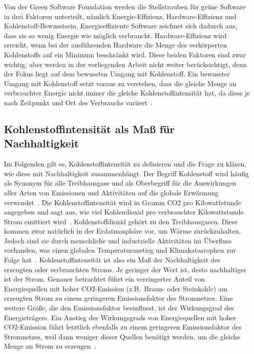 Von der Green Software Foundation werden die Stellstrauben für grüne Software in drei Faktoren unterteilt, nämlich Energie-Effizienz, Hardware-Effizienz und Kohlenstoff-Bewusstsein.
Energieeffiziente Software zeichnet sich dadurch aus, dass sie so wenig Energie wie möglich verbraucht.
Hardware-Effizienz wird erreicht, wenn bei der ausführenden Hardware die Menge des verkörperten Kohlenstoffs auf ein Minimum beschränkt wird.
Diese beiden Faktoren sind zwar wichtig, aber werden in der vorliegenden Arbeit nicht weiter berücksichtigt, denn der Fokus liegt auf dem bewussten Umgang mit Kohlenstoff.
Ein bewusster Umgang mit Kohlenstoff setzt voraus zu verstehen, dass die gleiche Menge an verbrauchter Energie nicht immer die gleiche Kohlenstoffintensität hat, da diese je nach Zeitpunkt und Ort des Verbrauchs variiert~\cite{GreenSoftwareFoundation.2022}.

\subsection{Kohlenstoffintensität als Maß für Nachhaltigkeit}
Im Folgenden gilt es, Kohlenstoffintensität zu definieren und die Frage zu klären, wie diese mit Nachhaltigkeit zusammenhängt.
Der Begriff Kohlenstoff wird häufig als Synonym für alle Treibhausgase und als Oberbegriff für die Auswirkungen aller Arten von Emissionen und Aktivitäten auf die globale Erwärmung verwendet~\cite{GreenSoftwareFoundation.2022}.
Die Kohlenstoffintensität wird in Gramm CO2 pro Kilowattstunde angegeben und sagt aus, wie viel Kohlendioxid pro verbrauchter Kilowattstunde Strom emittiert wird~\cite{LyndonRuff.20220420T15:34:17.000Z}.
Kohlenstoffdioxid gehört zu den Treibhausgasen.
Diese kommen zwar natürlich in der Erdatmosphäre vor, um Wärme zurückzuhalten.
Jedoch sind sie durch menschliche und industrielle Aktivitäten im Überfluss vorhanden, was einen globalen Temperaturanstieg und Klimakatasrophen zur Folge hat~\cite{Currie.2024}.
Kohlenstoffintensität ist also ein Maß der Nachhaltigkeit des erzeugten oder verbrauchten Stroms.
Je geringer der Wert ist, desto nachhaltiger ist der Strom.
Genauer betrachtet führt ein verringerter Anteil von Energiequellen mit hoher CO2-Emission (z.B.\ Braun- oder Steinkohle) am erzeugten Strom zu einem geringeren Emissionsfaktor des Stromnetzes.
Eine weitere Größe, die den Emissionsfaktor beeinflusst, ist der Wirkungsgrad des Energieträgers.
Ein Anstieg des Wirkungsgrads von Energiequellen mit hoher CO2-Emission führt letztlich ebenfalls zu einem geringeren Emissionsfaktor des Stromnetzes, weil dann weniger dieser Quellen benötigt werden, um die gleiche Menge an Strom zu erzeugen~\cite{Icha.2020}.

